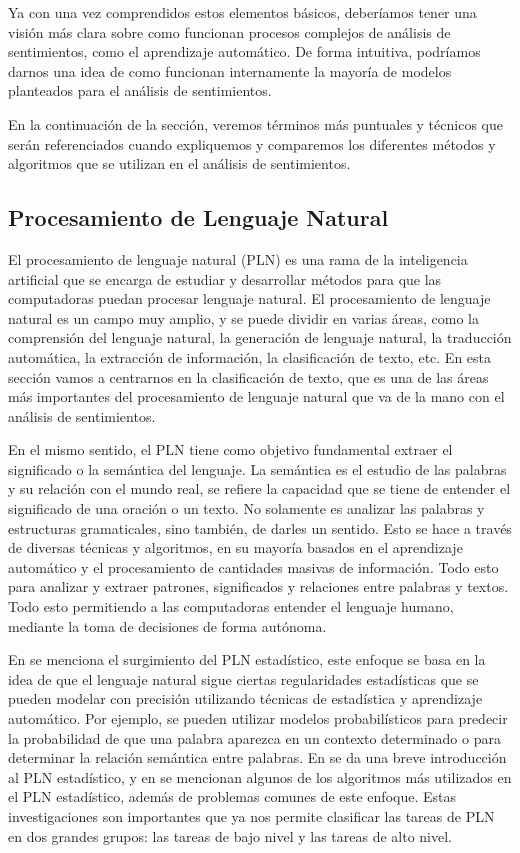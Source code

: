 \documentclass[conference]{IEEEtran}
\begin{document}
Ya con una vez comprendidos estos elementos básicos, deberíamos tener una visión más clara sobre como funcionan procesos complejos de análisis de sentimientos, como el aprendizaje automático. De forma intuitiva, podríamos darnos una idea de como funcionan internamente la mayoría de modelos planteados para el análisis de sentimientos.

En la continuación de la sección, veremos términos más puntuales y técnicos que serán referenciados cuando expliquemos y comparemos los diferentes métodos y algoritmos que se utilizan en el análisis de sentimientos.

\subsection{Procesamiento de Lenguaje Natural}

El procesamiento de lenguaje natural (PLN) es una rama de la inteligencia artificial que se encarga de estudiar y desarrollar métodos para que las computadoras puedan procesar lenguaje natural. 
El procesamiento de lenguaje natural es un campo muy amplio, y se puede dividir en varias áreas, como la comprensión del lenguaje natural, la generación de lenguaje natural, la traducción automática, la extracción de información, la clasificación de texto, etc. 
En esta sección vamos a centrarnos en la clasificación de texto, que es una de las áreas más importantes del procesamiento de lenguaje natural que va de la mano con el análisis de sentimientos.

En el mismo sentido, el PLN tiene como objetivo fundamental extraer el significado o la semántica del lenguaje. 
La semántica es el estudio de las palabras y su relación con el mundo real, se refiere la capacidad que se tiene de entender el significado de una oración o un texto. 
No solamente es analizar las palabras y estructuras gramaticales, sino también, de darles un sentido. 
Esto se hace a través de diversas técnicas y algoritmos, en su mayoría basados en el aprendizaje automático y el procesamiento de cantidades masivas de información. 
Todo esto para analizar y extraer patrones, significados y relaciones entre palabras y textos. 
Todo esto permitiendo a las computadoras entender el lenguaje humano, mediante la toma de decisiones de forma autónoma.

En \cite{b6} se menciona el surgimiento del PLN estadístico, este enfoque se basa en la idea de que el lenguaje natural sigue ciertas regularidades estadísticas que se pueden modelar con precisión utilizando técnicas de estadística y aprendizaje automático. 
Por ejemplo, se pueden utilizar modelos probabilísticos para predecir la probabilidad de que una palabra aparezca en un contexto determinado o para determinar la relación semántica entre palabras. 
En \cite{b7} se da una breve introducción al PLN estadístico, y en \cite{b8} se mencionan algunos de los algoritmos más utilizados en el PLN estadístico, además de problemas comunes de este enfoque. Estas investigaciones son importantes que ya nos permite clasificar las tareas de PLN en dos grandes grupos: las tareas de bajo nivel y las tareas de alto nivel.
\end{document}
